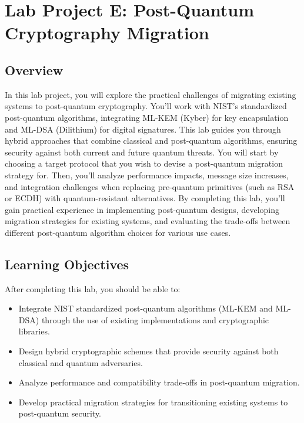 \documentclass[10pt,a4paper,american]{article}
\begin{document}
\classhandoutheader

\section*{Lab Project E: Post-Quantum Cryptography Migration}

\subsection*{Overview}
In this lab project, you will explore the practical challenges of migrating existing systems to post-quantum cryptography. You'll work with NIST's standardized post-quantum algorithms, integrating ML-KEM (Kyber) for key encapsulation and ML-DSA (Dilithium) for digital signatures. This lab guides you through hybrid approaches that combine classical and post-quantum algorithms, ensuring security against both current and future quantum threats. You will start by choosing a target protocol that you wish to devise a post-quantum migration strategy for. Then, you'll analyze performance impacts, message size increases, and integration challenges when replacing pre-quantum primitives (such as RSA or ECDH) with quantum-resistant alternatives. By completing this lab, you'll gain practical experience in implementing post-quantum designs, developing migration strategies for existing systems, and evaluating the trade-offs between different post-quantum algorithm choices for various use cases.

\subsection*{Learning Objectives}
After completing this lab, you should be able to:
\begin{itemize}
	\item Integrate NIST standardized post-quantum algorithms (ML-KEM and ML-DSA) through the use of existing implementations and cryptographic libraries.
	\item Design hybrid cryptographic schemes that provide security against both classical and quantum adversaries.
	\item Analyze performance and compatibility trade-offs in post-quantum migration.
	\item Develop practical migration strategies for transitioning existing systems to post-quantum security.
\end{itemize}
\end{document}
